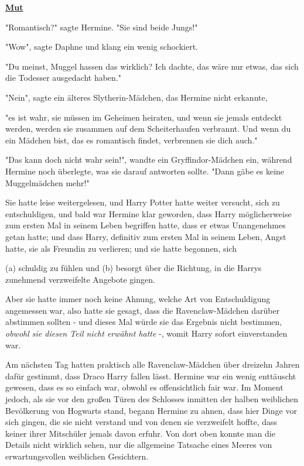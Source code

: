 

\hypertarget{mut}{%

\textbf{\uline{Mut}}

"Romantisch?" sagte Hermine. "Sie sind beide Jungs!"

"Wow", sagte Daphne und klang ein wenig schockiert.

"Du meinst, Muggel hassen das wirklich? Ich dachte, das wäre nur etwas, das sich die Todesser ausgedacht haben."

"Nein", sagte ein älteres Slytherin-Mädchen, das Hermine nicht erkannte,

"es ist wahr, sie müssen im Geheimen heiraten, und wenn sie jemals entdeckt werden, werden sie zusammen auf dem Scheiterhaufen verbrannt. Und wenn du ein Mädchen bist, das es romantisch findet, verbrennen sie dich auch."

"Das kann doch nicht wahr sein!", wandte ein Gryffindor-Mädchen ein, während Hermine noch überlegte, was sie darauf antworten sollte. "Dann gäbe es keine Muggelmädchen mehr!"

Sie hatte leise weitergelesen, und Harry Potter hatte weiter versucht, sich zu entschuldigen, und bald war Hermine klar geworden, dass Harry möglicherweise zum ersten Mal in seinem Leben begriffen hatte, dass er etwas Unangenehmes getan hatte; und dass Harry, definitiv zum ersten Mal in seinem Leben, Angst hatte, sie als Freundin zu verlieren; und sie hatte begonnen, sich

(a) schuldig zu fühlen und (b) besorgt über die Richtung, in die Harrys zunehmend verzweifelte Angebote gingen.

Aber sie hatte immer noch keine Ahnung, welche Art von Entschuldigung angemessen war, also hatte sie gesagt, dass die Ravenclaw-Mädchen darüber abstimmen sollten - und dieses Mal würde sie das Ergebnis nicht bestimmen, \emph{obwohl sie diesen Teil nicht erwähnt hatte} -, womit Harry sofort einverstanden war.

Am nächsten Tag hatten praktisch alle Ravenclaw-Mädchen über dreizehn Jahren dafür gestimmt, dass Draco Harry fallen lässt. Hermine war ein wenig enttäuscht gewesen, dass es so einfach war, obwohl es offensichtlich fair war. Im Moment jedoch, als sie vor den großen Türen des Schlosses inmitten der halben weiblichen Bevölkerung von Hogwarts stand, begann Hermine zu ahnen, dass hier Dinge vor sich gingen, die sie nicht verstand und von denen sie verzweifelt hoffte, dass keiner ihrer Mitschüler jemals davon erfuhr. Von dort oben konnte man die Details nicht wirklich sehen, nur die allgemeine Tatsache eines Meeres von erwartungsvollen weiblichen Gesichtern.

}
